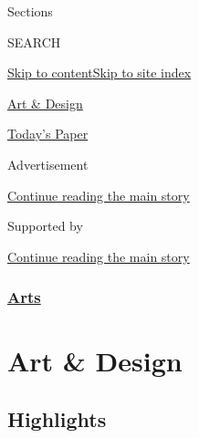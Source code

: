 Sections

SEARCH

\protect\hyperlink{site-content}{Skip to
content}\protect\hyperlink{site-index}{Skip to site index}

\href{https://www.nytimes.com/section/arts/design}{Art \& Design}

\href{https://myaccount.nytimes.com/auth/login?response_type=cookie\&client_id=vi}{}

\href{https://www.nytimes.com/section/todayspaper}{Today's Paper}

Advertisement

\protect\hyperlink{after-top}{Continue reading the main story}

Supported by

\protect\hyperlink{after-sponsor}{Continue reading the main story}

\hypertarget{arts}{%
\subsubsection{\texorpdfstring{\href{/section/arts}{Arts}}{Arts}}\label{arts}}

\hypertarget{art--design}{%
\section{Art \& Design}\label{art--design}}

\hypertarget{highlights}{%
\subsection{Highlights}\label{highlights}}

